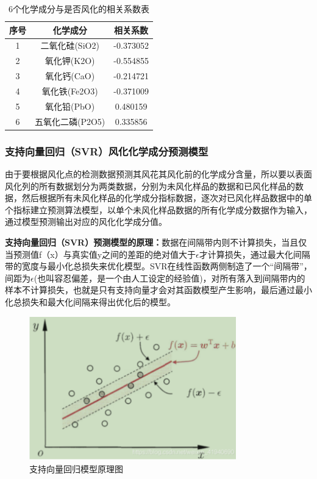 \documentclass[withoutpreface,bwprint]{cumcmthesis}%
\begin{document}
	\begin{table}[!htb]
		\centering
		\caption{6个化学成分与是否风化的相关系数表}
		\begin{tabular}{ccc}
			\toprule[1.5pt]
			序号&化学成分&相关系数\\
			\midrule[1pt]
			1&二氧化硅(SiO2) &-0.373052\\
			\hline
			2&氧化钾(K2O)&-0.554855\\	
			\hline
			3&氧化钙(CaO)&-0.214721\\	
			\hline
			4&氧化铁(Fe2O3)&-0.371009\\
			\hline
			5&氧化铅(PbO)&0.480159\\
			\hline
			6&五氧化二磷(P2O5)&0.335856\\
			\bottomrule[1.5pt]
		\end{tabular}
	\end{table}

	\subsubsection{支持向量回归（SVR）风化化学成分预测模型}
	由于要根据风化点的检测数据预测其风花其风化前的化学成分含量，所以要以表面风化列的所有数据划分为两类数据，分别为未风化样品的数据和已风化样品的数据，然后根据所有未风化样品的化学成分指标数据，逐次对已风化样品数据中的单个指标建立预测算法模型，以单个未风化样品数据的所有化学成分数据作为输入，通过模型预测输出对应的风化化学成分值。
	
	\textbf{支持向量回归（SVR）预测模型的原理：}数据在间隔带内则不计算损失，当且仅当预测值f（x）与真实值y之间的差距的绝对值大于$\epsilon$才计算损失，通过最大化间隔带的宽度与最小化总损失来优化模型。SVR在线性函数两侧制造了一个“间隔带”，间距为$\epsilon$(也叫容忍偏差，是一个由人工设定的经验值)，对所有落入到间隔带内的样本不计算损失，也就是只有支持向量才会对其函数模型产生影响，最后通过最小化总损失和最大化间隔来得出优化后的模型。
	
	\begin{figure}[!h]
		\centering
		\includegraphics[width=0.8\textwidth]{ph4}
		\caption{支持向量回归模型原理图}
		\label{fig:ph3}
	\end{figure}
\end{document}
